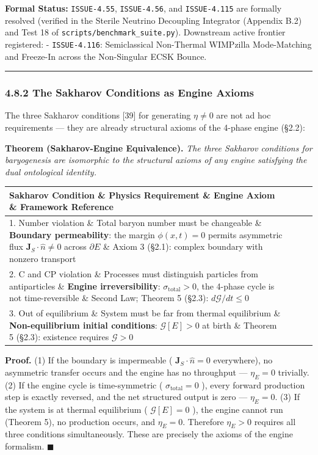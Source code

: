 \documentclass[11pt,a4paper]{article}
\theoremstyle{definition}\newtheorem{definition}{Definition}
\theoremstyle{remark}\newtheorem{remark}{Remark}
\begin{document}
\textbf{Formal Status:} \texttt{ISSUE-4.55}, \texttt{ISSUE-4.56}, and \texttt{ISSUE-4.115} are formally resolved (verified in the Sterile Neutrino Decoupling Integrator (Appendix B.2) and Test 18 of \texttt{scripts/benchmark_suite.py}). Downstream active frontier registered:
- \texttt{ISSUE-4.116}: Semiclassical Non-Thermal WIMPzilla Mode-Matching and Freeze-In across the Non-Singular ECSK Bounce.

\noindent\rule{\linewidth}{0.4pt}
\subsubsection{4.8.2 The Sakharov Conditions as Engine Axioms}

The three Sakharov conditions [39] for generating $\eta \neq 0$ are not ad hoc requirements — they are already structural axioms of the 4-phase engine (§2.2):

\textbf{Theorem (Sakharov-Engine Equivalence).} \textit{The three Sakharov conditions for baryogenesis are isomorphic to the structural axioms of any engine satisfying the dual ontological identity.}

\begin{longtable}{llll}
\hline
Sakharov Condition \& Physics Requirement \& Engine Axiom \& Framework Reference \\
\hline
1. Number violation \& Total baryon number must be changeable \& \textbf{Boundary permeability}: the margin $\phi(x,t) = 0$ permits asymmetric flux $\mathbf{J}_S \cdot \hat{n} \neq 0$ across $\partial E$ \& Axiom 3 (§2.1): complex boundary with nonzero transport \\
2. C and CP violation \& Processes must distinguish particles from antiparticles \& \textbf{Engine irreversibility}: $\sigma_{\text{total}} > 0$, the 4-phase cycle is not time-reversible \& Second Law; Theorem 5 (§2.3): $d\mathcal{G}/dt \leq 0$ \\
3. Out of equilibrium \& System must be far from thermal equilibrium \& \textbf{Non-equilibrium initial conditions}: $\mathcal{G}[E] > 0$ at birth \& Theorem 5 (§2.3): existence requires $\mathcal{G} > 0$ \\
\hline
\end{longtable}
\textbf{Proof.} (1) If the boundary is impermeable ( $\mathbf{J}_S \cdot \hat{n} = 0$ everywhere), no asymmetric transfer occurs and the engine has no throughput — $\eta_E = 0$ trivially. (2) If the engine cycle is time-symmetric ( $\sigma_{\text{total}} = 0$ ), every forward production step is exactly reversed, and the net structured output is zero — $\eta_E = 0$. (3) If the system is at thermal equilibrium ( $\mathcal{G}[E] = 0$ ), the engine cannot run (Theorem 5), no production occurs, and $\eta_E = 0$. Therefore $\eta_E > 0$ requires all three conditions simultaneously. These are precisely the axioms of the engine formalism. $\blacksquare$
\end{document}
